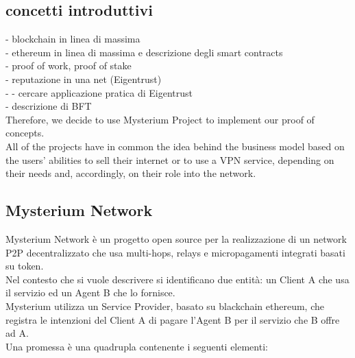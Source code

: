 \documentclass[]{article}
\begin{document}
	\subsection{concetti introduttivi}
	 - blockchain in linea di massima\\
	 - ethereum in linea di massima e descrizione degli smart contracts\\
	 - proof of work, proof of stake\\
	 - reputazione in una net (Eigentrust)\\
	 - - cercare applicazione pratica di Eigentrust\\
	 - descrizione di BFT\\
	
	Therefore, we decide to use Mysterium Project to implement our proof of concepts.\\
	All of the projects have in common the idea behind the business model based on the users' abilities to sell their internet or to use a VPN service, depending on their needs and, accordingly, on their role into the network.
	
	
	\subsection{Mysterium Network}
	Mysterium Network è un progetto open source per la realizzazione di un network P2P decentralizzato che usa multi-hops, relays e micropagamenti integrati basati su token.\\
	
	Nel contesto che si vuole descrivere si identificano due entità: un Client A che usa il servizio ed un Agent B che lo fornisce.\\
	Mysterium utilizza un Service Provider, basato su blackchain ethereum, che registra le intenzioni del Client A di pagare l’Agent B per il servizio che B offre ad A.\\
	
	Una promessa è una quadrupla contenente i seguenti elementi:
	
\end{document}
